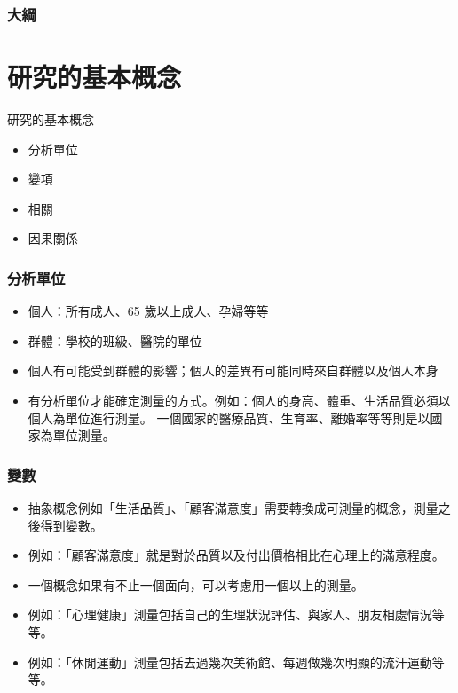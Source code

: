 \documentclass[xcolor=dvipsnames, 13pt]{beamer}
\title[信度與效度]{\kaiti{變數之信效度意義以及檢測}}
\author [CHT] {\fangsong 蔡佳泓\\
\bigskip
國立政治大學選舉研究中心\\
\bigskip
\texttt{tsaich@nccu.edu.tw}
}
\institute {NCCU}
\date[]{2015 年 3 月 12 日}
\begin{document}
\maketitle
\begin{frame}\frametitle{大綱}
\normalsize
\tableofcontents
\end{frame}

\section{研究的基本概念}

\begin{frame}{研究的基本概念}

\begin{itemize}
\item<1-> 分析單位
\item<2-> 變項
\item<3->  相關
\item<4-> 因果關係
\end{itemize}
\end{frame}

\begin{frame}\frametitle{分析單位}
\begin{itemize}
\item 個人：所有成人、65 歲以上成人、孕婦等等
\item 群體：學校的班級、醫院的單位
\item 個人有可能受到群體的影響；個人的差異有可能同時來自群體以及個人本身
\item 有分析單位才能確定測量的方式。例如：個人的身高、體重、生活品質必須以個人為單位進行測量。
一個國家的醫療品質、生育率、離婚率等等則是以國家為單位測量。
\end{itemize}
\end{frame}

\begin{frame}\frametitle{變數}
\begin{itemize}
\item 抽象概念例如「生活品質」、「顧客滿意度」需要轉換成可測量的概念，測量之後得到變數。
\item 例如：「顧客滿意度」就是對於品質以及付出價格相比在心理上的滿意程度。
\item 一個概念如果有不止一個面向，可以考慮用一個以上的測量。
\item 例如：「心理健康」測量包括自己的生理狀況評估、與家人、朋友相處情況等等。
\item 例如：「休閒運動」測量包括去過幾次美術館、每週做幾次明顯的流汗運動等等。
\end{itemize}
\end{frame}
\end{document}
